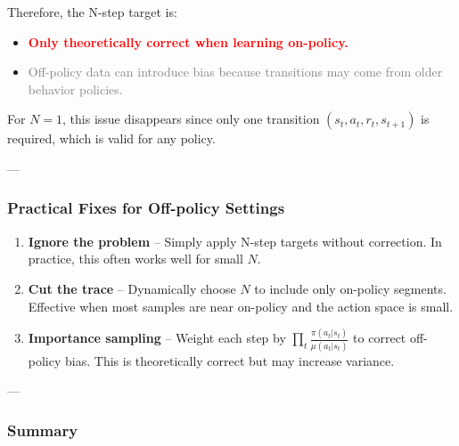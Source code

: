 \documentclass[12pt]{article}
\theoremstyle{definition} %
\theoremstyle{plain} %
\theoremstyle{remark} %
\begin{document}
\begin{CJK}{UTF8}{gbsn}
Therefore, the N-step target is:
\begin{itemize}
    \item \textcolor{red}{\textbf{Only theoretically correct when learning on-policy.}}
    \item \textcolor{gray}{Off-policy data can introduce bias because transitions may come from older behavior policies.}
\end{itemize}

For $N = 1$, this issue disappears since only one transition $(s_t, a_t, r_t, s_{t+1})$ is required, which is valid for any policy.

---

\subsubsection*{Practical Fixes for Off-policy Settings}

\begin{enumerate}
    \item \textbf{Ignore the problem} – Simply apply N-step targets without correction.  
    In practice, this often works well for small $N$.
    \item \textbf{Cut the trace} – Dynamically choose $N$ to include only on-policy segments.  
    Effective when most samples are near on-policy and the action space is small.
    \item \textbf{Importance sampling} – Weight each step by 
    $\prod_t \frac{\pi(a_t|s_t)}{\mu(a_t|s_t)}$ 
    to correct off-policy bias.  
    This is theoretically correct but may increase variance.
\end{enumerate}

---

\subsubsection*{Summary}

\begin{table}[h!]
\centering
\renewcommand{\arraystretch}{1.3}
\end{table}


\end{CJK}
\end{document}
